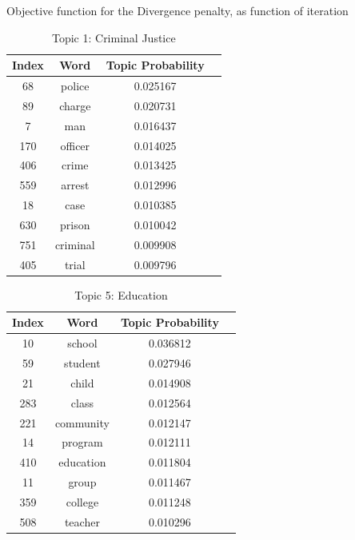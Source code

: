 \documentclass[11pt]{article}
\begin{document}
Objective function for the Divergence penalty, as function of iteration

\begin{table}[!th]
\centering
\begin{tabular}{|c|c|cl}
\hline
Index & Word & Topic Probability \\
\hline
68  & police & 0.025167 \\
89  & charge & 0.020731 \\
7   & man & 0.016437 \\
170 & officer & 0.014025 \\
406 & crime & 0.013425 \\
559 & arrest & 0.012996 \\
18  & case & 0.010385 \\
630 & prison & 0.010042 \\
751 & criminal & 0.009908 \\
405 & trial & 0.009796 \\
\hline
\end{tabular}
\caption{Topic 1: Criminal Justice}
\label{ex:table}
\end{table}

\begin{table}[!th]
\centering
\begin{tabular}{|c|c|cl}
\hline
Index & Word & Topic Probability \\
\hline
10  & school & 0.036812 \\
59  & student & 0.027946 \\
21  & child & 0.014908 \\
283 & class & 0.012564 \\
221 & community & 0.012147 \\
14  & program & 0.012111 \\
410 & education & 0.011804 \\
11  & group & 0.011467 \\
359 & college & 0.011248 \\
508 & teacher & 0.010296 \\
\hline
\end{tabular}
\caption{Topic 5: Education}
\label{ex:table}
\end{table}
\end{document}
